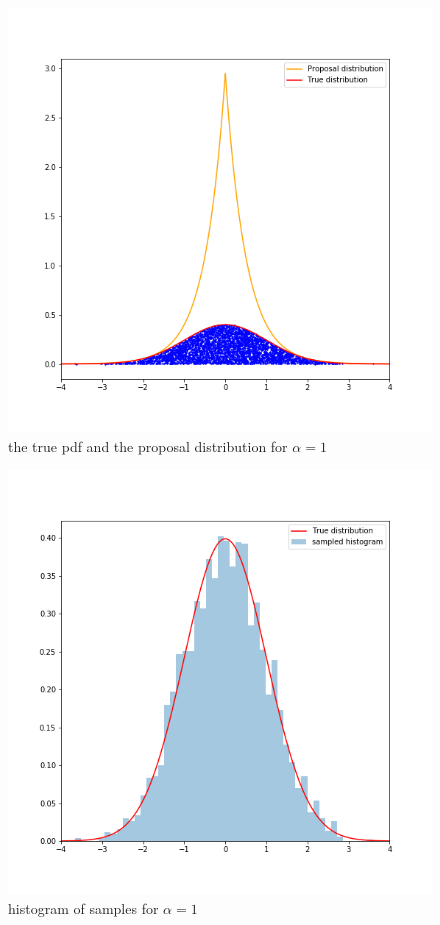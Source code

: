 \documentclass{article}
\begin{document}
\begin{figure}[h!]
\centering
\includegraphics[scale=0.4]{h4p1c3.png}
\caption{ the true pdf and the proposal distribution for $\alpha = 1$}
\end{figure}

\begin{figure}[h!]
\centering
\includegraphics[scale=0.4]{h4p1c4.png}
\caption{histogram of samples for $\alpha = 1$}
\end{figure}
\end{document}
